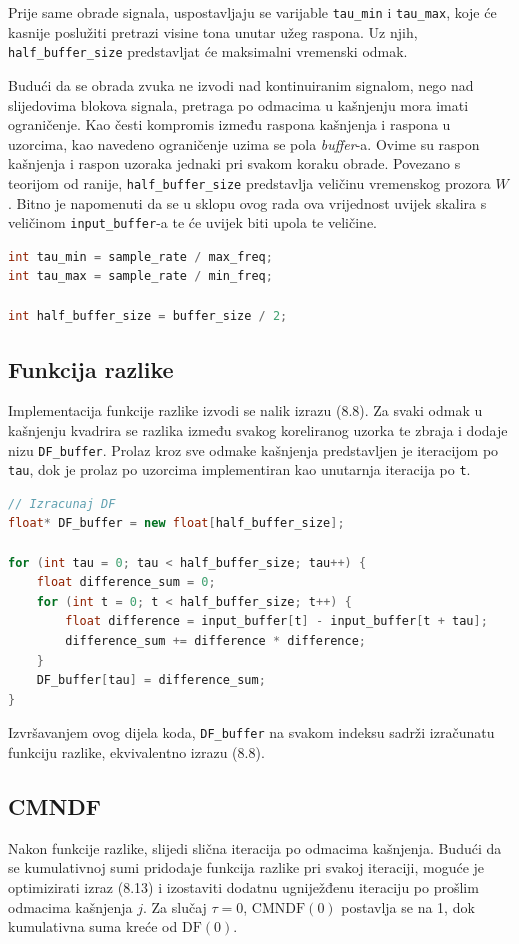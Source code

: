 \documentclass[times, utf8, diplomski, numeric]{fer}
\begin{document}
Prije same obrade signala, uspostavljaju se varijable \verb*|tau_min| i \verb*|tau_max|, koje će kasnije poslužiti pretrazi visine tona unutar užeg raspona. Uz njih, \verb*|half_buffer_size| predstavljat će maksimalni vremenski odmak. 

Budući da se obrada zvuka ne izvodi nad kontinuiranim signalom, nego nad slijedovima blokova signala, pretraga po odmacima u kašnjenju mora imati ograničenje. Kao česti kompromis između raspona kašnjenja i raspona u uzorcima, kao navedeno ograničenje uzima se pola \textit{buffer}-a. Ovime su raspon kašnjenja i raspon uzoraka jednaki pri svakom koraku obrade. Povezano s teorijom od ranije, \verb*|half_buffer_size| predstavlja veličinu vremenskog prozora $W$. Bitno je napomenuti da se u sklopu ovog rada ova vrijednost uvijek skalira s veličinom \verb*|input_buffer|-a te će uvijek biti upola te veličine.

\begin{lstlisting}[language=C++, frame=single]
int tau_min = sample_rate / max_freq;
int tau_max = sample_rate / min_freq;

int half_buffer_size = buffer_size / 2;
\end{lstlisting}

\subsection{Funkcija razlike}
%
Implementacija funkcije razlike izvodi se nalik izrazu (8.8). Za svaki odmak u kašnjenju kvadrira se razlika između svakog koreliranog uzorka te zbraja i dodaje nizu \verb*|DF_buffer|. Prolaz kroz sve odmake kašnjenja predstavljen je iteracijom po \verb*|tau|, dok je prolaz po uzorcima implementiran kao unutarnja iteracija po \verb*|t|.

\begin{lstlisting}[language=C++, frame=single]
// Izracunaj DF
float* DF_buffer = new float[half_buffer_size];

for (int tau = 0; tau < half_buffer_size; tau++) {
	float difference_sum = 0;
	for (int t = 0; t < half_buffer_size; t++) {
		float difference = input_buffer[t] - input_buffer[t + tau];
		difference_sum += difference * difference;
	}
	DF_buffer[tau] = difference_sum;
}
\end{lstlisting}

Izvršavanjem ovog dijela koda, \verb*|DF_buffer| na svakom indeksu sadrži izračunatu funkciju razlike, ekvivalentno izrazu (8.8).	

\subsection{CMNDF}
%
Nakon funkcije razlike, slijedi slična iteracija po odmacima kašnjenja. Budući da se kumulativnoj sumi pridodaje funkcija razlike pri svakoj iteraciji, moguće je optimizirati izraz (8.13) i izostaviti dodatnu ugniježđenu iteraciju po prošlim odmacima kašnjenja $j$. Za slučaj $\tau = 0$, $\mathrm{CMNDF}(0)$ postavlja se na 1, dok kumulativna suma kreće od $\mathrm{DF}(0)$.
\end{document}
